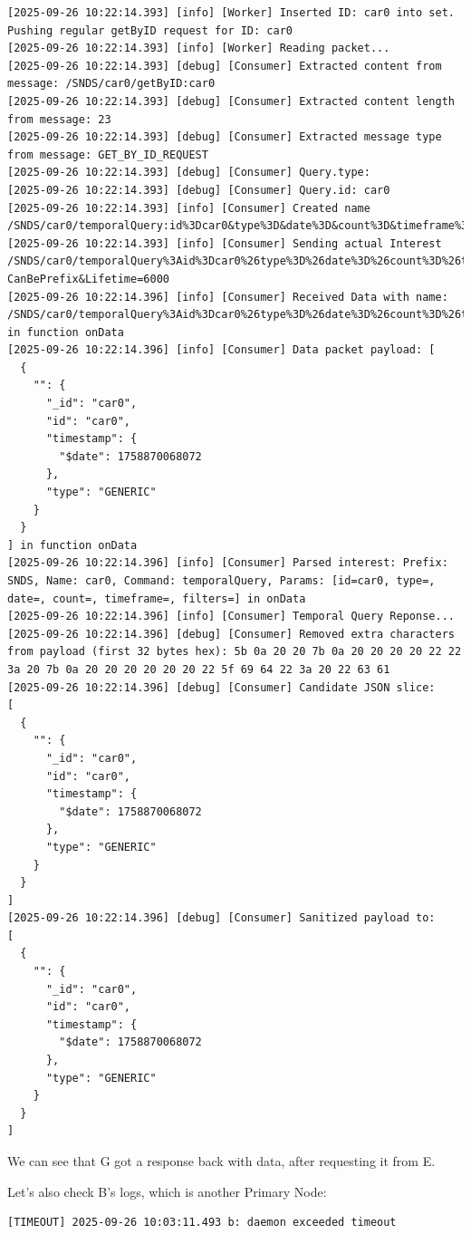 \documentclass{article}
\begin{document}
\begin{lstlisting}[language=log, caption={G performs the request to retrieve ex A's data, which are now provided through E}, label={lst:g-get-data-from-e}]
[2025-09-26 10:22:14.393] [info] [Worker] Inserted ID: car0 into set. Pushing regular getByID request for ID: car0
[2025-09-26 10:22:14.393] [info] [Worker] Reading packet...
[2025-09-26 10:22:14.393] [debug] [Consumer] Extracted content from message: /SNDS/car0/getByID:car0
[2025-09-26 10:22:14.393] [debug] [Consumer] Extracted content length from message: 23
[2025-09-26 10:22:14.393] [debug] [Consumer] Extracted message type from message: GET_BY_ID_REQUEST
[2025-09-26 10:22:14.393] [debug] [Consumer] Query.type: 
[2025-09-26 10:22:14.393] [debug] [Consumer] Query.id: car0
[2025-09-26 10:22:14.393] [info] [Consumer] Created name /SNDS/car0/temporalQuery:id%3Dcar0&type%3D&date%3D&count%3D&timeframe%3D&filters%3D
[2025-09-26 10:22:14.393] [info] [Consumer] Sending actual Interest /SNDS/car0/temporalQuery%3Aid%3Dcar0%26type%3D%26date%3D%26count%3D%26timeframe%3D%26filters%3D?CanBePrefix&Lifetime=6000
[2025-09-26 10:22:14.396] [info] [Consumer] Received Data with name: /SNDS/car0/temporalQuery%3Aid%3Dcar0%26type%3D%26date%3D%26count%3D%26timeframe%3D%26filters%3D in function onData
[2025-09-26 10:22:14.396] [info] [Consumer] Data packet payload: [
  {
    "": {
      "_id": "car0",
      "id": "car0",
      "timestamp": {
        "$date": 1758870068072
      },
      "type": "GENERIC"
    }
  }
] in function onData
[2025-09-26 10:22:14.396] [info] [Consumer] Parsed interest: Prefix: SNDS, Name: car0, Command: temporalQuery, Params: [id=car0, type=, date=, count=, timeframe=, filters=] in onData
[2025-09-26 10:22:14.396] [info] [Consumer] Temporal Query Reponse...
[2025-09-26 10:22:14.396] [debug] [Consumer] Removed extra characters from payload (first 32 bytes hex): 5b 0a 20 20 7b 0a 20 20 20 20 22 22 3a 20 7b 0a 20 20 20 20 20 20 22 5f 69 64 22 3a 20 22 63 61 
[2025-09-26 10:22:14.396] [debug] [Consumer] Candidate JSON slice:
[
  {
    "": {
      "_id": "car0",
      "id": "car0",
      "timestamp": {
        "$date": 1758870068072
      },
      "type": "GENERIC"
    }
  }
]
[2025-09-26 10:22:14.396] [debug] [Consumer] Sanitized payload to:
[
  {
    "": {
      "_id": "car0",
      "id": "car0",
      "timestamp": {
        "$date": 1758870068072
      },
      "type": "GENERIC"
    }
  }
]    
\end{lstlisting}

We can see that G got a response back with data, after requesting it from E.

Let's also check B's logs, which is another Primary Node:

\begin{lstlisting}[language=log, caption={Timeout timestamp of Node B}, label={lst:timeout-b}]
[TIMEOUT] 2025-09-26 10:03:11.493 b: daemon exceeded timeout
\end{lstlisting}
\end{document}
